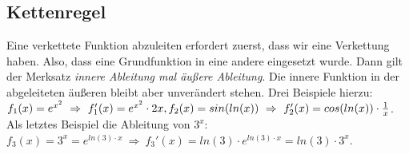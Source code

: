 \subsection{Kettenregel}
	Eine verkettete Funktion abzuleiten erfordert zuerst, dass wir eine Verkettung
	haben. Also, dass eine Grundfunktion in eine andere eingesetzt wurde. Dann gilt
	der Merksatz \emph{innere Ableitung mal äußere Ableitung}. Die innere Funktion
	in der abgeleiteten äußeren bleibt aber unverändert stehen.
	\formel{\[h(x)=f(g(x))\ \Rightarrow\ h'(x)=f'(g(x))\cdot g'(x)\]}
	Drei Beispiele hierzu: \(f_1(x)=e^{x^2}\ \Rightarrow\ f_1'(x)=e^{x^2}\cdot
	2x,\\
	f_2(x)=sin(ln(x))\ \Rightarrow\ f_2'(x)=cos(ln(x))\cdot \frac{1}{x}\).\\
	Als letztes Beispiel die Ableitung von \(3^x\): \(f_3(x)=3^x=e^{ln(3)\cdot x}\
	\Rightarrow\ f_3'(x)=ln(3)\cdot e^{ln(3)\cdot x}=ln(3)\cdot 3^x\).
